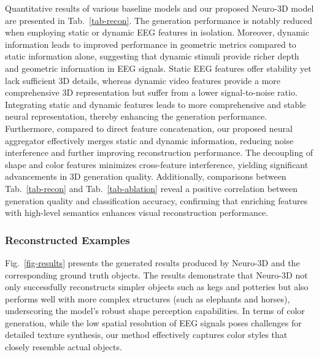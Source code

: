 Quantitative results of various baseline models and our proposed Neuro-3D model are presented in Tab.~\ref{tab-recon}. The generation performance is notably reduced when employing static or dynamic EEG features in isolation.  
Moreover, dynamic information leads to improved performance in geometric metrics compared to static information alone, suggesting that dynamic stimuli provide richer depth and geometric information in EEG signals.
Static EEG features offer stability yet lack sufficient 3D details, whereas dynamic video features provide a more comprehensive 3D representation but suffer from a lower signal-to-noise ratio. 
Integrating static and dynamic features leads to more comprehensive and stable neural representation, thereby enhancing the generation performance.
Furthermore, compared to direct feature concatenation, our proposed neural aggregator effectively merges static and dynamic information, reducing noise interference and further improving reconstruction performance. The decoupling of shape and color features minimizes cross-feature interference, yielding significant advancements in 3D generation quality. Additionally, comparisons between Tab.~\ref{tab-recon} and Tab.~\ref{tab-ablation} reveal a positive correlation between generation quality and classification accuracy, confirming that 
enriching features with high-level semantics enhances visual reconstruction performance.

\subsubsection{Reconstructed Examples}

Fig.~\ref{fig-results} presents the generated results produced by Neuro-3D and the corresponding ground truth objects. The results demonstrate that Neuro-3D not only successfully reconstructs simpler objects such as kegs and potteries but also performs well with more complex structures (such as elephants and horses), underscoring the model’s robust shape perception capabilities. In terms of color generation, while the low spatial resolution of EEG signals poses challenges for detailed texture synthesis, our method effectively captures color styles that closely resemble actual objects. 

